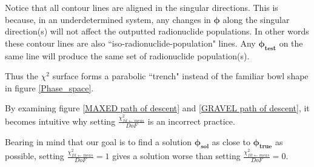 \documentclass[a4paper, 12pt]{article}
\newcommand{\ve}[1]{\boldsymbol{#1}}
\newcommand{\chifit}{\frac{\chi^2_{fit\leftarrow meas}}{DoF} }
\begin{document}
Notice that all contour lines are aligned in the singular directions. This is because, in an underdetermined system, any changes in $\ve{\phi}$ along the singular direction(s) will not affect the outputted radionuclide populations. In other words these contour lines are also ``iso-radionuclide-population" lines.
Any $\ve{\phi_{test}}$ on the same line will produce the same set of radionuclide population(s).

Thus the $\chi^2$ surface forms a parabolic ``trench" instead of the familiar bowl shape in figure \ref{Phase_space}.
    
By examining figure \ref{MAXED path of descent} and \ref{GRAVEL path of descent}, it becomes intuitive why setting $\chifit$ is an incorrect practice.

Bearing in mind that our goal is to find a solution $\ve{\phi_{sol}}$ as close to $\ve{\phi_{true}}$ as possible, setting $\chifit=1$ gives a solution worse than setting $\chifit=0$.
\end{document}
